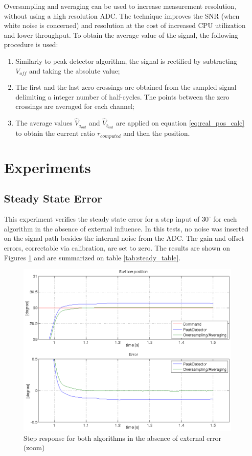 \documentclass[conference]{IEEEtran}
\begin{document}
Oversampling and averaging can be used to increase measurement resolution, without using a high resolution ADC. The technique improves the SNR (when white noise is concerned) and resolution at the cost of increased CPU utilization and lower throughput. To obtain the average value of the signal, the following procedure is used:

\begin{enumerate}
\item Similarly to peak detector algorithm, the signal is rectified by subtracting $V_{off}$ and taking the absolute value;
\item The first and the last zero crossings are obtained from the sampled signal delimiting a integer number of half-cycles. The points between the zero crossings are averaged for each channel;
\item The average values $\hat{V}_{a_{out}}$ and $\hat{V}_{b_{out}}$ are applied on equation \ref{eq:real_pos_calc} to obtain the current ratio $r_{computed}$ and then the position. 
\end{enumerate}

\section{Experiments}
\subsection{Steady State Error}
This experiment verifies the steady state error for a step input of $30^{\circ}$ for each algorithm in the absence of external influence. In this tests, no noise was inserted on the signal path besides the internal noise from the ADC. The gain and offset errors, correctable via calibration, are set to zero. The results are shown on Figures \ref{fig:step_steadystate_zoom} and are summarized on table \ref{tab:steady_table}.


\begin{figure}[h!]
\centering
\includegraphics[scale=0.32]{pics/results/steadystate_final_zoom.png}
\caption{Step response for both algorithms in the absence of external error (zoom)}
\label{fig:step_steadystate_zoom}
\end{figure}
\end{document}
